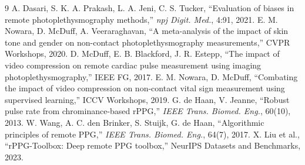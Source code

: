 \documentclass[conference]{IEEEtran}
\begin{document}
\begin{thebibliography}{9}
 A. Dasari, S. K. A. Prakash, L. A. Jeni, C. S. Tucker, ``Evaluation of biases in remote photoplethysmography methods,'' \emph{npj Digit. Med.}, 4:91, 2021.
 E. M. Nowara, D. McDuff, A. Veeraraghavan, ``A meta-analysis of the impact of skin tone and gender on non-contact photoplethysmography measurements,'' CVPR Workshops, 2020.
 D. McDuff, E. B. Blackford, J. R. Estepp, ``The impact of video compression on remote cardiac pulse measurement using imaging photoplethysmography,'' IEEE FG, 2017.
 E. M. Nowara, D. McDuff, ``Combating the impact of video compression on non-contact vital sign measurement using supervised learning,'' ICCV Workshops, 2019.
 G. de Haan, V. Jeanne, ``Robust pulse rate from chrominance-based rPPG,'' \emph{IEEE Trans. Biomed. Eng.}, 60(10), 2013.
 W. Wang, A. C. den Brinker, S. Stuijk, G. de Haan, ``Algorithmic principles of remote PPG,'' \emph{IEEE Trans. Biomed. Eng.}, 64(7), 2017.
 X. Liu et al., ``rPPG-Toolbox: Deep remote PPG toolbox,'' NeurIPS Datasets and Benchmarks, 2023.
\end{thebibliography}
\end{document}
